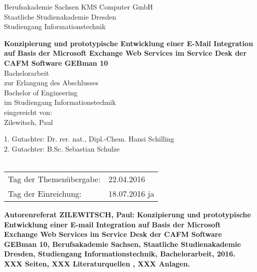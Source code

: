 \documentclass[fontsize=12pt]{scrartcl}
\begin{document}
\thispagestyle{empty}
\large
	\noindent Berufsakademie Sachsen \hfill KMS Computer GmbH\\
	Staatliche Studienakademie Dresden \\
	Studiengang Informationstechnik
\begin{center}	
	\vspace*{4cm}
	\textbf{Konzipierung und prototypische Entwicklung einer E-Mail Integration auf Basis der Microsoft Exchange Web Services im Service Desk der CAFM Software GEBman 10}\\
	\vspace*{2cm}
		Bachelorarbeit\\ zur Erlangung des Abschlusses\\ Bachelor of Engineering\\ im Studiengang 						Informationstechnik \\
	\vspace*{2cm}
	eingereicht von:\\Zilewitsch, Paul
	\vspace*{3cm}
\end{center}
	1. Gutachter: Dr. rer. nat., Dipl.-Chem. Hansi Schilling\\
	2. Gutachter: B.Sc. Sebastian Schulze 
	\\\\
	\begin{tabular}{@{}ll}
		Tag der Themenübergabe:&22.04.2016\\
		Tag der Einreichung:&18.07.2016 ja
	\end{tabular}
\pagebreak





\noindent
\Large\bfseries
Autorenreferat
\normalsize\mdseries
\thispagestyle{empty}
\newline\newline
\noindent
ZILEWITSCH, Paul: Konzipierung und prototypische Entwicklung einer E-mail Integration auf Basis der Microsoft Exchange Web Services im Service Desk der CAFM Software GEBman 10,  Berufsakademie Sachsen, Staatliche Studienakademie Dresden, Studiengang Informationstechnik, Bachelorarbeit, 2016.\\ 
XXX Seiten, XXX Literaturquellen , XXX Anlagen. 
\newpage
\end{document}
